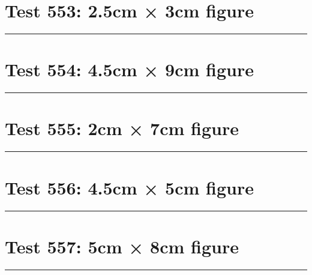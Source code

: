 \documentclass[a4paper,11pt]{article}
\begin{document}
\section*{Test 553: 2.5cm × 3cm figure}
\begin{swarmwrap}%
  \begin{minipage}[t]{2cm}
    \centering
    \rule{\linewidth}{3cm}
  \end{minipage}%
\end{swarmwrap}%
\swarmwrapnext
\lipsum[43]
\lipsum[44]
\lipsum[45]
\lipsum[46]
\lipsum[47]
\section*{Test 554: 4.5cm × 9cm figure}
\begin{swarmwrap}%
  \begin{minipage}[t]{4cm}
    \centering
    \rule{\linewidth}{9cm}
  \end{minipage}%
\end{swarmwrap}%
\swarmwrapnext
\lipsum[49]
\lipsum[50]
\lipsum[51]
\lipsum[52]
\lipsum[53]
\section*{Test 555: 2cm × 7cm figure}
\begin{swarmwrap}%
  \begin{minipage}[t]{2cm}
    \centering
    \rule{\linewidth}{7cm}
  \end{minipage}%
\end{swarmwrap}%
\swarmwrapnext
\lipsum[147]
\lipsum[148]
\lipsum[149]
\lipsum[150]
\lipsum[1]
\section*{Test 556: 4.5cm × 5cm figure}
\begin{swarmwrap}%
  \begin{minipage}[t]{4cm}
    \centering
    \rule{\linewidth}{5cm}
  \end{minipage}%
\end{swarmwrap}%
\swarmwrapnext
\lipsum[105]
\lipsum[106]
\lipsum[107]
\lipsum[108]
\section*{Test 557: 5cm × 8cm figure}
\begin{swarmwrap}%
  \begin{minipage}[t]{5cm}
    \centering
    \rule{\linewidth}{8cm}
  \end{minipage}%
\end{swarmwrap}%
\swarmwrapnext
\lipsum[24]
\lipsum[25]
\lipsum[26]
\lipsum[27]
\lipsum[28]
\end{document}
